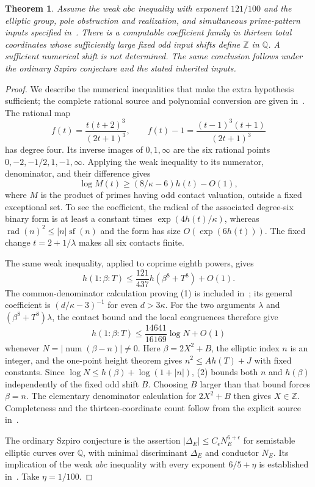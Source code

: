 \documentclass[11pt,a4paper]{article}
\newtheorem{theorem}{Theorem}
\newcommand{\Q}{\mathbb Q}\newcommand{\Z}{\mathbb Z}
\DeclareMathOperator{\rad}{rad}
\DeclareMathOperator{\sfpart}{sf}
\begin{document}
\begin{theorem}\label{thm:weak}
Assume the weak $abc$ inequality with exponent $121/100$ and the
elliptic group, pole obstruction and realization, and simultaneous
prime-pattern inputs specified in~\cite{Thirteen}.
There is a computable coefficient family in thirteen total
coordinates whose sufficiently large fixed odd input shifts define
$\Z$ in $\Q$. A sufficient numerical shift is not determined.
The same conclusion follows under the ordinary Szpiro conjecture
and the stated inherited inputs.
\end{theorem}
\begin{proof}
We describe the numerical inequalities that make the extra
hypothesis sufficient; the complete rational source and polynomial
conversion are given in~\cite{Thirteen}. The rational map
\[
 f(t)=\frac{t(t+2)^3}{(2t+1)^3},
 \qquad
 f(t)-1=\frac{(t-1)^3(t+1)}{(2t+1)^3}
\]
has degree four. Its inverse images of $0,1,\infty$ are the
six rational points $0,-2,-1/2,1,-1,\infty$.
Applying the weak inequality to its numerator, denominator, and
their difference gives
\[
 \log M(t)\ge(8/\kappa-6)h(t)-O(1),
\]
where $M$ is the product of primes having odd contact valuation,
outside a fixed exceptional set. To see the coefficient, the
radical of the associated degree-six binary form is at least a
constant times $\exp(4h(t)/\kappa)$, whereas
$\rad(n)^2\le |n|\sfpart(n)$ and the form has size
$O(\exp(6h(t)))$. The fixed change $t=2+1/\lambda$ makes all
six contacts finite.

The same weak inequality, applied to coprime eighth powers, gives
\[
 h(1:\beta:T)\le\frac{121}{437}h(\beta^8+T^8)+O(1).
 \tag{1}
\]
The common-denominator calculation proving (1) is included
in~\cite{Thirteen}; its general coefficient is
$(d/\kappa-3)^{-1}$ for even $d>3\kappa$.
For the two arguments $\lambda$ and $(\beta^8+T^8)\lambda$,
the contact bound and the local congruences therefore give
\[
 h(1:\beta:T)\le
 \frac{14641}{16169}\log N+O(1)
 \tag{2}
\]
whenever $N=|\operatorname{num}(\beta-n)|\ne0$.
Here $\beta=2X^2+B$, the elliptic index $n$ is an integer,
and the one-point height theorem gives $n^2\le A h(T)+J$
with fixed constants. Since
$\log N\le h(\beta)+\log(1+|n|)$, (2) bounds both $n$ and
$h(\beta)$ independently of the fixed odd shift $B$.
Choosing $B$ larger than that bound forces $\beta=n$.
The elementary denominator calculation for $2X^2+B$ then gives
$X\in\Z$. Completeness and the thirteen-coordinate count follow
from the explicit source in~\cite{Thirteen}.

The ordinary Szpiro conjecture is the assertion
$|\Delta_E|\le C_\epsilon N_E^{6+\epsilon}$
for semistable elliptic curves over $\Q$, with minimal
discriminant $\Delta_E$ and conductor $N_E$.
Its implication of the weak $abc$ inequality with every exponent
$6/5+\eta$ is established in~\cite[\S I.3]{Oesterle}.
Take $\eta=1/100$.
\end{proof}
\end{document}
